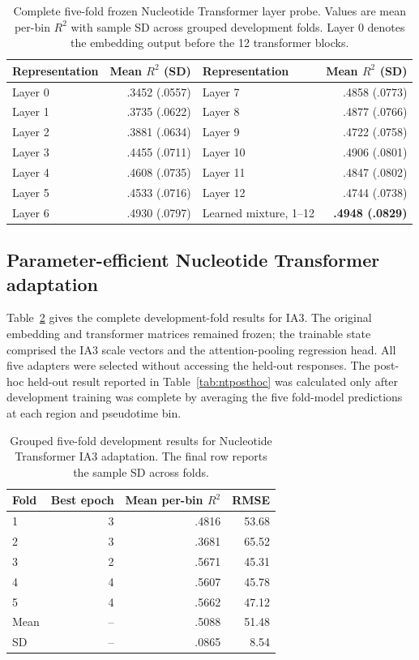 \documentclass[a4paper,12pt]{article}
\begin{document}
\begin{table}[htbp]
\centering
\caption{Complete five-fold frozen Nucleotide Transformer layer probe. Values are mean per-bin $R^2$ with sample SD across grouped development folds. Layer 0 denotes the embedding output before the 12 transformer blocks.}
\label{tab:ntlayersfull}
\small
\begin{tabular}{lr@{\qquad}lr}
\toprule
Representation & Mean $R^2$ (SD) & Representation & Mean $R^2$ (SD) \\
\midrule
Layer 0  & .3452 (.0557) & Layer 7  & .4858 (.0773) \\
Layer 1  & .3735 (.0622) & Layer 8  & .4877 (.0766) \\
Layer 2  & .3881 (.0634) & Layer 9  & .4722 (.0758) \\
Layer 3  & .4455 (.0711) & Layer 10 & .4906 (.0801) \\
Layer 4  & .4608 (.0735) & Layer 11 & .4847 (.0802) \\
Layer 5  & .4533 (.0716) & Layer 12 & .4744 (.0738) \\
Layer 6  & .4930 (.0797) & Learned mixture, 1--12 & \textbf{.4948 (.0829)} \\
\bottomrule
\end{tabular}
\end{table}

\subsection*{Parameter-efficient Nucleotide Transformer adaptation}

Table~\ref{tab:ia3folds} gives the complete development-fold results for IA3. The original embedding and transformer matrices remained frozen; the trainable state comprised the IA3 scale vectors and the attention-pooling regression head. All five adapters were selected without accessing the held-out responses. The post-hoc held-out result reported in Table~\ref{tab:ntposthoc} was calculated only after development training was complete by averaging the five fold-model predictions at each region and pseudotime bin.

\begin{table}[htbp]
\centering
\caption{Grouped five-fold development results for Nucleotide Transformer IA3 adaptation. The final row reports the sample SD across folds.}
\label{tab:ia3folds}
\small
\begin{tabular}{lrrr}
\toprule
Fold & Best epoch & Mean per-bin $R^2$ & RMSE \\
\midrule
1 & 3 & .4816 & 53.68 \\
2 & 3 & .3681 & 65.52 \\
3 & 2 & .5671 & 45.31 \\
4 & 4 & .5607 & 45.78 \\
5 & 4 & .5662 & 47.12 \\
\midrule
Mean & -- & .5088 & 51.48 \\
SD & -- & .0865 & 8.54 \\
\bottomrule
\end{tabular}
\end{table}
\end{document}
